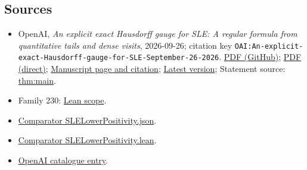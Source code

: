 \documentclass[11pt]{article}
\begin{document}
\subsection{Sources}
\begin{itemize}
\item OpenAI, \emph{An explicit exact Hausdorff gauge for SLE: A regular formula from quantitative tails and dense visits}, 2026-09-26; citation key \texttt{OAI:An-explicit-exact-Hausdorff-gauge-for-SLE-September-26-2026}. \href{https://github.com/openai/math/blob/adc7f1241b42e322a6451854ab7e4b4c146bf78a/preprints/An-explicit-exact-Hausdorff-gauge-for-SLE-September-26-2026/An-explicit-exact-Hausdorff-gauge-for-SLE-September-26-2026.pdf}{PDF (GitHub)}; \href{https://github.com/openai/math/raw/adc7f1241b42e322a6451854ab7e4b4c146bf78a/preprints/An-explicit-exact-Hausdorff-gauge-for-SLE-September-26-2026/An-explicit-exact-Hausdorff-gauge-for-SLE-September-26-2026.pdf}{PDF (direct)}; \href{https://github.com/openai/math/blob/adc7f1241b42e322a6451854ab7e4b4c146bf78a/preprints/An-explicit-exact-Hausdorff-gauge-for-SLE-September-26-2026/README.md}{Manuscript page and citation}; \href{https://github.com/openai/math/blob/main/preprints/An-explicit-exact-Hausdorff-gauge-for-SLE-September-26-2026/An-explicit-exact-Hausdorff-gauge-for-SLE-September-26-2026.pdf}{Latest version}; Statement source: \href{https://github.com/openai/math/blob/adc7f1241b42e322a6451854ab7e4b4c146bf78a/preprints/An-explicit-exact-Hausdorff-gauge-for-SLE-September-26-2026/build/sections/introduction.tex\#L66}{thm:main}.
\item Family 230: \href{https://github.com/openai/math/blob/adc7f1241b42e322a6451854ab7e4b4c146bf78a/lean/docs/230.md}{Lean scope}.
\item \href{https://github.com/openai/math/blob/adc7f1241b42e322a6451854ab7e4b4c146bf78a/lean/ComparatorChallenges/SLELowerPositivity.json}{Comparator SLELowerPositivity.json}.
\item \href{https://github.com/openai/math/blob/adc7f1241b42e322a6451854ab7e4b4c146bf78a/lean/ComparatorChallenges/SLELowerPositivity.lean}{Comparator SLELowerPositivity.lean}.
\item \href{https://github.com/openai/math/blob/adc7f1241b42e322a6451854ab7e4b4c146bf78a/CONTENTS.md}{OpenAI catalogue entry}.
\end{itemize}
\end{document}

